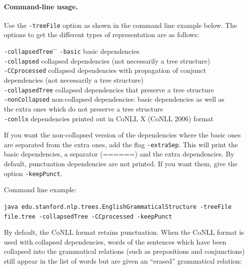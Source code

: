 \documentclass[11pt,letter]{article}
\begin{document}
\paragraph{Command-line usage.} Use the \texttt{-treeFile} option as shown in the command line example below. The options to get the different types of representation are as follows:
\begin{tabbing}
\hspace{.3cm} \= \texttt{-collapsedTree} \= \hspace{.3cm} \= \kill
\> \texttt{-basic} \>\> basic dependencies\\
\> \texttt{-collapsed} \>\> collapsed dependencies (not necessarily a tree structure)\\
\> \texttt{-CCprocessed} \>\> collapsed dependencies with propagation of conjunct \\
\> \> \> dependencies (not necessarily a tree structure)\\
\> \texttt{-collapsedTree} \>\> collapsed dependencies that preserve a tree structure\\
\> \texttt{-nonCollapsed} \>\> non-collapsed dependencies: basic dependencies as well as\\
\> 						 \>\> the extra ones which do not preserve a tree structure\\
\> \texttt{-conllx} \>\> dependencies printed out in CoNLL X (CoNLL 2006) format
\end{tabbing}

\noindent If you want the non-collapsed version of the dependencies where the basic ones are separated from the extra ones, add the flag \texttt{-extraSep}. This will print the basic dependencies, a separator (======) and the extra dependencies.
By default, punctuation dependencies are not printed.  If you want
them, give the option \texttt{-keepPunct}.

\bigskip

\noindent Command line example:\\
{\hangindent=0.5in\raggedright\texttt{java  edu.stanford.nlp.trees.EnglishGrammaticalStructure -treeFile
    file.tree -collapsedTree -CCprocessed -keepPunct} \\}

\vspace*{.4cm}
\noindent By default, the CoNLL format retains punctuation. When the
CoNLL format is used with collapsed dependencies, words of the
sentences which have been collapsed into the grammatical relations
(such as prepositions and conjunctions) still appear in the list of
words but are given an ``erased'' grammatical relation:
\end{document}
